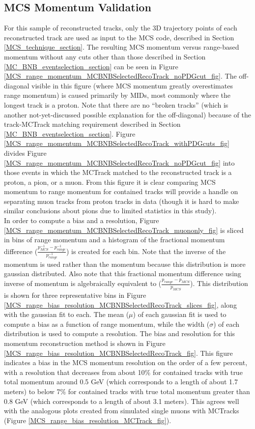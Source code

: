 \subsection{MCS Momentum Validation}\label{MCS_Momentum_Validation_MCBNBSelectedRecoTrack_section}
For this sample of reconstructed tracks, only the 3D trajectory points of each reconstructed track are used as input to the MCS code, described in Section \ref{MCS_technique_section}. The resulting MCS momentum versus range-based momentum without any cuts other than those described in Section \ref{MC_BNB_eventselection_section} can be seen in Figure \ref{MCS_range_momentum_MCBNBSelectedRecoTrack_noPDGcut_fig}. The off-diagonal visible in this figure (where MCS momentum greatly overestimates range momentum) is caused primarily by MIDs, most commonly where the longest track is a proton. Note that there are no ``broken tracks'' (which is another not-yet-discussed possible explanation for the off-diagonal) because of the track-{\sc MCTrack} matching requirement described in Section \ref{MC_BNB_eventselection_section}. Figure \ref{MCS_range_momentum_MCBNBSelectedRecoTrack_withPDGcuts_fig} divides Figure \ref{MCS_range_momentum_MCBNBSelectedRecoTrack_noPDGcut_fig} into those events in which the MCTrack matched to the reconstructed track is a proton, a pion, or a muon. From this figure it is clear comparing MCS momentum to range momentum for contained tracks will provide a handle on separating muon tracks from proton tracks in data (though it is hard to make similar conclusions about pions due to limited statistics in this study).\\

In order to compute a bias and a resolution, Figure \ref{MCS_range_momentum_MCBNBSelectedRecoTrack_muononly_fig} is sliced in bins of range momentum and a histogram of the fractional momentum difference ($\frac{p_{MCS}^{-1} - p_{range}^{-1}}{p_{range}^{-1}}$) is created for each bin. Note that the inverse of the momentum is used rather than the momentum because this distribution is more gaussian distributed. Also note that this fractional momentum difference using inverse of momentum is algebraically equivalent to ($\frac{p_{range} - p_{MCS}}{p_{MCS}}$). This distribution is shown for three representative bins in Figure \ref{MCS_range_bias_resolution_MCBNBSelectedRecoTrack_slices_fig}, along with the gaussian fit to each.  The mean ($\mu$) of each gaussian fit is used to compute a bias as a function of range momentum, while the width ($\sigma$) of each distribution is used to compute a resolution. The bias and resolution for this momentum reconstruction method is shown in Figure \ref{MCS_range_bias_resolution_MCBNBSelectedRecoTrack_fig}. This figure indicates a bias in the MCS momentum resolution on the order of a few percent, with a resolution that decreases from about 10\% for contained tracks with true total momentum around 0.5 GeV (which corresponds to a length of about 1.7 meters) to below 7\% for contained tracks with true total momentum greater than 0.8 GeV (which corresponds to a length of about 3.1 meters). This agrees well with the analogous plots created from simulated single muons with {\sc MCTracks} (Figure \ref{MCS_range_bias_resolution_MCTrack_fig}).


